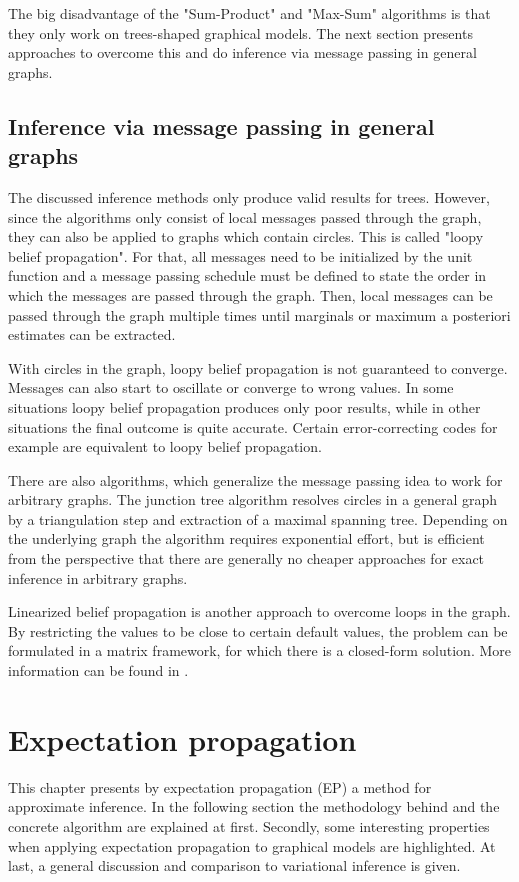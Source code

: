\documentclass{sigkdd}
\begin{document}
The big disadvantage of the "Sum-Product" and "Max-Sum" algorithms is that they only work on trees-shaped graphical models. The next section presents approaches to overcome this and do inference via message passing in general graphs.

\subsection{Inference via message passing in general graphs}
The discussed inference methods only produce valid results for trees. However, since the algorithms only consist of local messages passed through the graph, they can also be applied to graphs which contain circles. This is called "loopy belief propagation". For that, all messages need to be initialized by the unit function and a message passing schedule must be defined to state the order in which the messages are passed through the graph. Then, local messages can be passed through the graph multiple times until marginals or maximum a posteriori estimates can be extracted.

With circles in the graph, loopy belief propagation is not guaranteed to converge. Messages can also start to oscillate or converge to wrong values. In some situations loopy belief propagation produces only poor results, while in other situations the final outcome is quite accurate. Certain error-correcting codes for example are equivalent to loopy belief propagation.

There are also algorithms, which generalize the message passing idea to work for arbitrary graphs. The junction tree algorithm resolves circles in a general graph by a triangulation step and extraction of a maximal spanning tree. Depending on the underlying graph the algorithm requires exponential effort, but is efficient from the perspective that there are generally no cheaper approaches for exact inference in arbitrary graphs.

Linearized belief propagation is another approach to overcome loops in the graph. By restricting the values to be close to certain default values, the problem can be formulated in a matrix framework, for which there is a closed-form solution. More information can be found in \cite{Gatterbauer:2015:LSB:2735479.2735490}. 

\section{Expectation propagation}\label{chapter:approximate_inference}
This chapter presents by expectation propagation (EP) a method for approximate inference. In the following section the methodology behind and the concrete algorithm are explained at first. Secondly, some interesting properties when applying expectation propagation to graphical models are highlighted. At last, a general discussion and comparison to variational inference is given.
\end{document}
